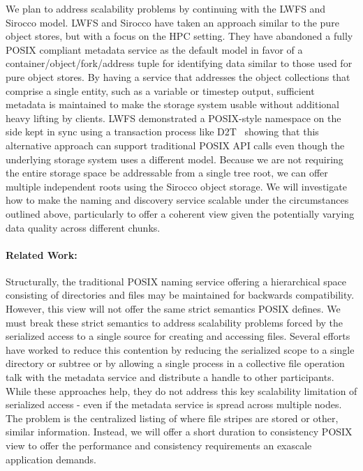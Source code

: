 We plan to address scalability problems by continuing with the LWFS and Sirocco
model. LWFS and Sirocco have taken an approach similar to the pure object
stores, but with a focus on the HPC setting. They have abandoned a fully POSIX
compliant metadata service as the default model in favor of a
container/object/fork/address tuple for identifying data similar to those used
for pure object stores. By having a service that addresses the object
collections that comprise a single entity, such as a variable or timestep
output, sufficient metadata is maintained to make the storage system usable
without additional heavy lifting by clients.  LWFS demonstrated a POSIX-style
namespace on the side kept in sync using a transaction process like
D2T~\cite{lofstead:2012:txn} showing that this alternative approach can support
traditional POSIX API calls even though the underlying storage system uses a
different model. Because we are not requiring the entire storage space be
addressable from a single tree root, we can offer multiple independent roots
using the Sirocco object storage. We will investigate how to make the naming
and discovery service scalable under the circumstances outlined above,
particularly to offer a coherent view given the potentially varying data
quality across different chunks.

\paragraph{Related Work:}
Structurally, the traditional POSIX naming service offering a hierarchical
space consisting of directories and files may be maintained for backwards
compatibility. However, this view will not offer the same strict semantics
POSIX defines. We must break these strict semantics to address scalability
problems forced by the serialized access to a single source for creating and
accessing files.  Several efforts~\cite{patil:2007:giga+,carns:pvfs} have
worked to reduce this contention by reducing the serialized
scope to a single directory or subtree or by allowing a single process in a
collective file operation talk with the metadata service and distribute a
handle to other participants. While these approaches help, they do not address
this key scalability limitation of serialized access - even if the metadata
service is spread across multiple nodes. The problem is the centralized listing
of where file stripes are stored or other, similar information. Instead, we
will offer a short duration to consistency POSIX view to offer the performance
and consistency requirements an exascale application demands.

